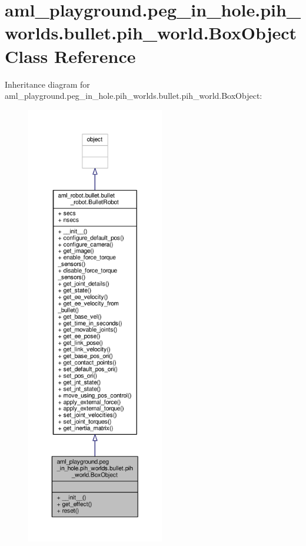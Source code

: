 \hypertarget{classaml__playground_1_1peg__in__hole_1_1pih__worlds_1_1bullet_1_1pih__world_1_1_box_object}{\section{aml\-\_\-playground.\-peg\-\_\-in\-\_\-hole.\-pih\-\_\-worlds.\-bullet.\-pih\-\_\-world.\-Box\-Object Class Reference}
\label{classaml__playground_1_1peg__in__hole_1_1pih__worlds_1_1bullet_1_1pih__world_1_1_box_object}
}


Inheritance diagram for aml\-\_\-playground.\-peg\-\_\-in\-\_\-hole.\-pih\-\_\-worlds.\-bullet.\-pih\-\_\-world.\-Box\-Object\-:
\nopagebreak
\begin{figure}[H]
\begin{center}
\leavevmode
\includegraphics[height=550pt]{classaml__playground_1_1peg__in__hole_1_1pih__worlds_1_1bullet_1_1pih__world_1_1_box_object__inherit__graph}
\end{center}
\end{figure}


